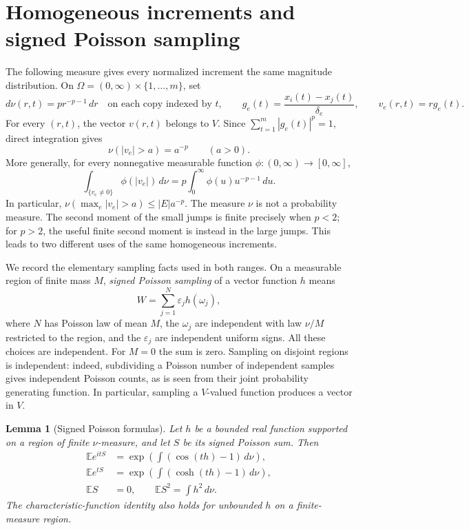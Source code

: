 \documentclass[11pt]{article}
\newcommand{\E}{\mathbb E}
\newtheorem{lemma}[theorem]{Lemma}
\theoremstyle{remark}
\numberwithin{equation}{section}
\begin{document}
\section{Homogeneous increments and signed Poisson sampling}

The following measure gives every normalized increment the same
magnitude distribution. On
$\Omega=(0,\infty)\times\{1,\ldots,m\}$, set
\[
 d\nu(r,t)=p r^{-p-1}\,dr
 \quad\text{on each copy indexed by }t,
 \qquad
 g_e(t)=\frac{x_i(t)-x_j(t)}{\delta_e},\qquad v_e(r,t)=r g_e(t).
\]
For every $(r,t)$, the vector $v(r,t)$ belongs to $V$. Since
$\sum_{t=1}^m|g_e(t)|^p=1$, direct integration gives
\begin{equation}\label{eq:powerlaw}
 \nu(|v_e|>a)=a^{-p}\qquad(a>0).
\end{equation}
More generally, for every nonnegative measurable function
$\phi:(0,\infty)\to[0,\infty]$,
\begin{equation}\label{eq:magnitude-density}
 \int_{\{v_e\ne0\}}\phi(|v_e|)\,d\nu
 =p\int_0^\infty\phi(u)u^{-p-1}\,du.
\end{equation}
In particular, $\nu(\max_e|v_e|>a)\le|E|a^{-p}$. The measure $\nu$
is not a probability measure. The second moment of the small jumps
is finite precisely when $p<2$; for $p>2$, the useful finite second
moment is instead in the large jumps. This leads to two different
uses of the same homogeneous increments.

We record the elementary sampling facts used in both ranges. On a
measurable region of finite mass $M$, \emph{signed Poisson sampling}
of a vector function $h$ means
\[
 W=\sum_{j=1}^{N}\varepsilon_j h(\omega_j),
\]
where $N$ has Poisson law of mean $M$, the $\omega_j$ are independent
with law $\nu/M$ restricted to the region, and the $\varepsilon_j$
are independent uniform signs. All these choices are independent.
For $M=0$ the sum is zero. Sampling on disjoint regions is independent:
indeed, subdividing a Poisson number of independent samples gives
independent Poisson counts, as is seen from their joint probability
generating function. In particular, sampling a $V$-valued function
produces a vector in $V$.

\begin{lemma}[Signed Poisson formulas]\label{lem:poisson}
Let $h$ be a bounded real function supported on a region of finite
$\nu$-measure, and let $S$ be its signed Poisson sum. Then
\begin{align}
 \E e^{itS}
 &=\exp\left(\int(\cos(th)-1)\,d\nu\right),\label{eq:poisson-cf}\\
 \E e^{tS}
 &=\exp\left(\int(\cosh(th)-1)\,d\nu\right),\label{eq:poisson-mgf}\\
 \E S&=0,\qquad \E S^2=\int h^2\,d\nu.\label{eq:poisson-variance}
\end{align}
The characteristic-function identity also holds for unbounded $h$
on a finite-measure region.
\end{lemma}
\end{document}
